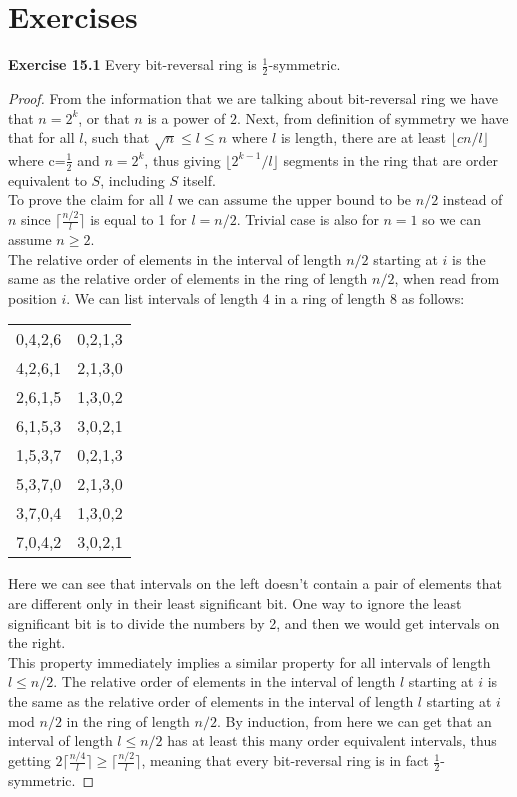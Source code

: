 \documentclass[a4paper]{article}
\begin{document}
\section{Exercises}
\noindent \textbf{Exercise 15.1}  Every bit-reversal ring is $\frac{1}{2}$-symmetric.
\begin{proof}
From the information that we are talking about bit-reversal ring we have that $n=2^{k}$, or that $n$ is a power of $2$. Next, from definition of symmetry we have that for all $l$, such that $\sqrt{n} \leq l \leq n$ where $l$ is length, there are at least $\lfloor cn/l \rfloor$ where c=$\frac{1}{2}$ and $n=2^{k}$, thus giving $\lfloor 2^{k-1}/l \rfloor$ segments in the ring that are order equivalent to $S$, including $S$ itself.\\
To prove the claim for all $l$ we can assume the upper bound to be $n/2$ instead of $n$ since $\lceil \frac{n/2}{l} \rceil$ is equal to 1 for $l=n/2$. Trivial case is also for $n=1$ so we can assume $n \geq 2$.\\
The relative order of elements in the interval of length $n/2$ starting at $i$ is the same as the relative order of elements in the ring of length $n/2$, when read from position $i$. We can list intervals of length 4 in a ring of length 8 as follows:
\begin{center}
\begin{tabular}{ c c }
0,4,2,6 & 0,2,1,3 \\
4,2,6,1 & 2,1,3,0 \\
2,6,1,5 & 1,3,0,2 \\
6,1,5,3 & 3,0,2,1 \\
1,5,3,7 & 0,2,1,3 \\
5,3,7,0 & 2,1,3,0 \\
3,7,0,4 & 1,3,0,2 \\
7,0,4,2 & 3,0,2,1
\end{tabular}
\end{center}
Here we can see that intervals on the left doesn't contain a pair of elements that are different only in their least significant bit. One way to ignore the least significant bit is to divide the numbers by 2, and then we would get intervals on the right.\\
This property immediately implies a similar property for all intervals of length $l \leq n/2$. The relative order of elements in the interval of length $l$ starting at $i$ is the same as the relative order of elements in the interval of length $l$ starting at $i$ mod $n/2$ in the ring of length $n/2$. By induction, from here we can get that an interval of length $l \leq n/2$ has at least this many order equivalent intervals, thus getting $2\lceil \frac{n/4}{l} \rceil \geq \lceil \frac{n/2}{l} \rceil$, meaning that every bit-reversal ring is in fact $\frac{1}{2}$-symmetric.
\end{proof}
\end{document}
